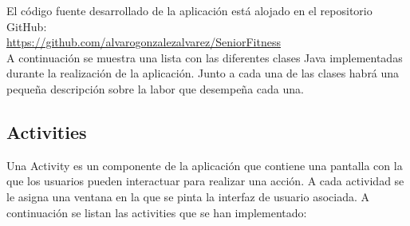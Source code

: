 El código fuente desarrollado de la aplicación está alojado en el repositorio GitHub:\\ 

\url{https://github.com/alvarogonzalezalvarez/SeniorFitness}\\

A continuación se muestra una lista con las diferentes clases Java implementadas durante la realización de la aplicación. Junto a cada una de las clases habrá una pequeña descripción sobre la labor que desempeña cada una.

\subsection{Activities}

Una Activity es un componente de la aplicación que contiene una pantalla con la que los usuarios pueden interactuar para realizar una acción. A cada actividad se le asigna una ventana en la que se pinta la interfaz de usuario asociada. A continuación se listan las activities que se han implementado:


